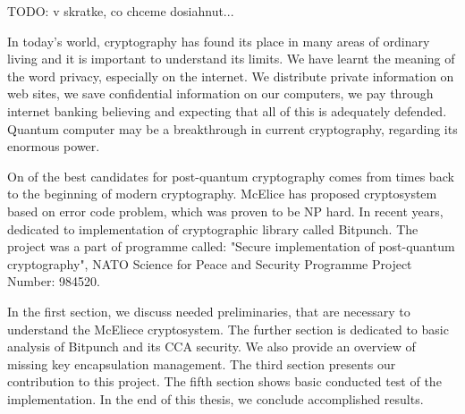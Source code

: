 TODO: v skratke, co chceme dosiahnut...

In today's world, cryptography has found its place in many areas of ordinary living and it is important to understand its limits. We have learnt the meaning of the word privacy, especially on the internet. We distribute private information on web sites, we save confidential information on our computers, we pay through internet banking believing and expecting that all of this is adequately defended. Quantum computer may be a breakthrough in current cryptography, regarding its enormous power.

On of the best candidates for post-quantum cryptography comes from times back to the beginning of modern cryptography. McElice has proposed cryptosystem based on error code problem, which was proven to be NP hard. In recent years, dedicated to implementation of cryptographic library called Bitpunch. The project was a part of programme called: "Secure implementation of post-quantum cryptography", NATO Science for Peace and Security Programme Project Number: 984520. 

\indent In the first section, we discuss needed preliminaries, that are necessary to understand the McEliece cryptosystem.
The further section is dedicated to basic analysis of Bitpunch and its CCA security. We also provide an overview of missing key encapsulation management. 
The third section presents our contribution to this project. The fifth section shows basic conducted test of the implementation. In the end of this thesis, we conclude accomplished results.

  
